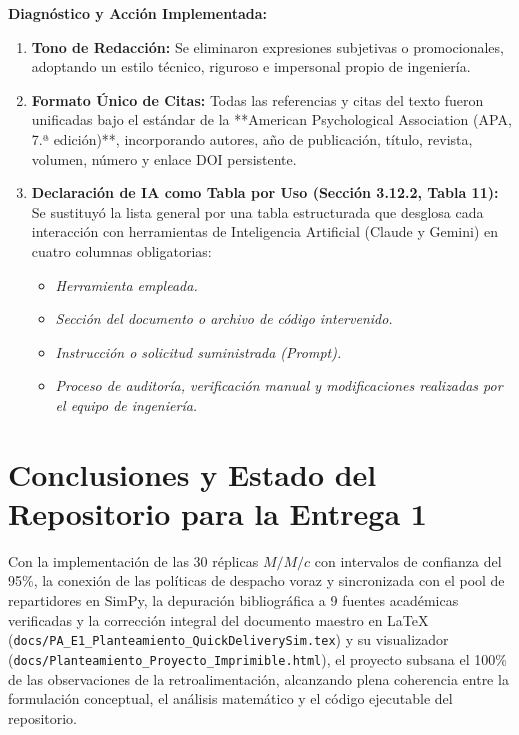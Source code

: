 \documentclass[11pt,letterpaper]{article}
\begin{document}
\vspace{0.4em}
\noindent \textbf{Diagnóstico y Acción Implementada:}
\begin{enumerate}[leftmargin=1.5em, itemsep=0.2em]
    \item \textbf{Tono de Redacción:} Se eliminaron expresiones subjetivas o promocionales, adoptando un estilo técnico, riguroso e impersonal propio de ingeniería.
    \item \textbf{Formato Único de Citas:} Todas las referencias y citas del texto fueron unificadas bajo el estándar de la **American Psychological Association (APA, 7.ª edición)**, incorporando autores, año de publicación, título, revista, volumen, número y enlace DOI persistente.
    \item \textbf{Declaración de IA como Tabla por Uso (Sección 3.12.2, Tabla 11):} Se sustituyó la lista general por una tabla estructurada que desglosa cada interacción con herramientas de Inteligencia Artificial (Claude y Gemini) en cuatro columnas obligatorias:
    \begin{itemize}[leftmargin=1.2em]
        \item \textit{Herramienta empleada.}
        \item \textit{Sección del documento o archivo de código intervenido.}
        \item \textit{Instrucción o solicitud suministrada (Prompt).}
        \item \textit{Proceso de auditoría, verificación manual y modificaciones realizadas por el equipo de ingeniería.}
    \end{itemize}
\end{enumerate}

\section{Conclusiones y Estado del Repositorio para la Entrega 1}
Con la implementación de las 30 réplicas $M/M/c$ con intervalos de confianza del 95\%, la conexión de las políticas de despacho voraz y sincronizada con el pool de repartidores en SimPy, la depuración bibliográfica a 9 fuentes académicas verificadas y la corrección integral del documento maestro en \LaTeX{} (\texttt{docs/PA\_E1\_Planteamiento\_QuickDeliverySim.tex}) y su visualizador (\texttt{docs/Planteamiento\_Proyecto\_Imprimible.html}), el proyecto subsana el 100\% de las observaciones de la retroalimentación, alcanzando plena coherencia entre la formulación conceptual, el análisis matemático y el código ejecutable del repositorio.
\end{document}
